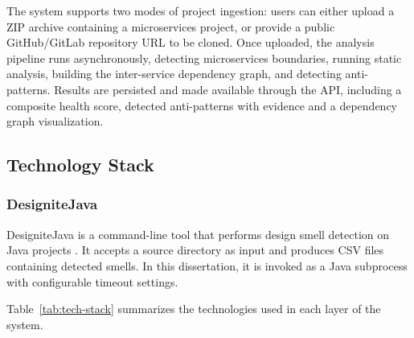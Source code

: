 The system supports two modes of project ingestion: users can either upload a ZIP archive containing a microservices project, or provide a public GitHub/GitLab repository URL to be cloned. Once uploaded, the analysis pipeline runs asynchronously, detecting microservices boundaries, running static analysis, building the inter-service dependency graph, and detecting anti-patterns. Results are persisted and made available through the API, including a composite health score, detected anti-patterns with evidence and a dependency graph visualization.

\subsection{Technology Stack}
\label{subsec:tech-stack}

\subsubsection{DesigniteJava}
\label{subsec:designite-java}

\par DesigniteJava is a command-line tool that performs design smell detection on Java projects \cite{Sharma2018}. It accepts a source directory as input and produces CSV files containing detected smells. In this dissertation, it is invoked as a Java subprocess with configurable timeout settings.

Table~\ref{tab:tech-stack} summarizes the technologies used in each layer of the system.

